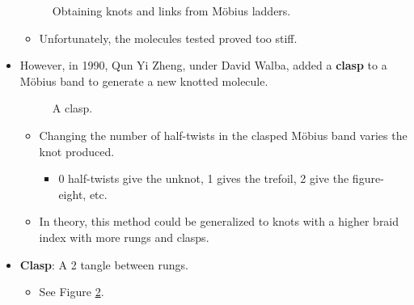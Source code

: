 \documentclass[titlepage]{article}
\numberwithin{figure}{section}
\numberwithin{table}{section}
\numberwithin{equation}{section}
\begin{document}
\begin{itemize}
\begin{figure}[h!]
        \caption{Obtaining knots and links from M\"{o}bius ladders.}
        \label{fig:ladder}
    \end{figure}
    \begin{itemize}
        \item Unfortunately, the molecules tested proved too stiff.
    \end{itemize}
    \item However, in 1990, Qun Yi Zheng, under David Walba, added a \textbf{clasp} to a M\"{o}bius band to generate a new knotted molecule.
    \begin{figure}[h!]
        \centering
        \caption{A clasp.}
        \label{fig:clasp}
    \end{figure}
    \begin{itemize}
        \item Changing the number of half-twists in the clasped M\"{o}bius band varies the knot produced.
        \begin{itemize}
            \item 0 half-twists give the unknot, 1 gives the trefoil, 2 give the figure-eight, etc.
        \end{itemize}
        \item In theory, this method could be generalized to knots with a higher braid index with more rungs and clasps.
    \end{itemize}
    \item \textbf{Clasp}: A 2 tangle between rungs.
    \begin{itemize}
        \item See Figure \ref{fig:clasp}.
    \end{itemize}
\end{itemize}
\end{document}
